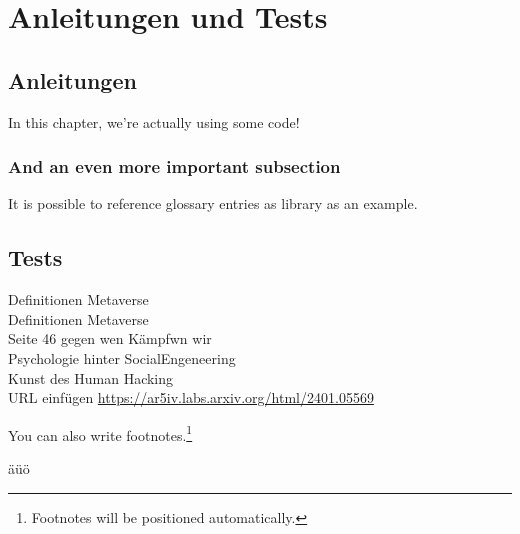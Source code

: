 \chapter{Anleitungen und Tests}\label{ch:Anleitungen}

\section{Anleitungen}
In this chapter, we're actually using some code!




%




\subsection{And an even more important subsection}

It is possible to reference glossary entries as \gls{library} as an example.

\section*{Tests}


Definitionen Metaverse \cite{Ball22}
\\Definitionen Metaverse \cite{Drip22} \\
Seite 46 gegen wen Kämpfwn wir \cite{Hypp22}\\
Psychologie hinter SocialEngeneering \cite{schu11}\\
Kunst des Human Hacking \cite{Hadn11}
\\

URL einfügen \url{https://ar5iv.labs.arxiv.org/html/2401.05569}


You can also write footnotes.\footnote{Footnotes will be positioned automatically.}

äüö
